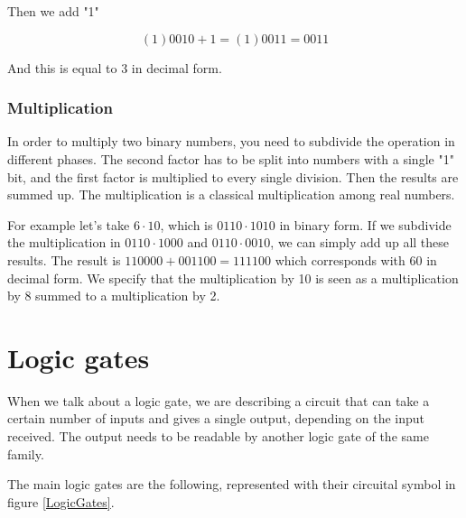 \documentclass{article}
\begin{document}
Then we add "1"

\[(1)0010+1=(1)0011 = 0011\]
  
And this is equal to 3 in decimal form.



\subsubsection{Multiplication}

In order to multiply two binary numbers, you need to subdivide the operation in different phases. The second factor has to be split into numbers with a single "1" bit, and the first factor is multiplied to every single division. Then the results are summed up. The multiplication is a classical multiplication among real numbers. 

\vspace{3mm}

For example let's take $6 \cdot 10$, which is $0110 \cdot 1010$ in binary form. If we subdivide the multiplication in $0110 \cdot 1000$ and $0110 \cdot 0010$, we can simply add up all these results. The result is $110000 + 001100 = 111100$ which corresponds with 60 in decimal form. We specify that the multiplication by 10 is seen as a multiplication by 8 summed to a multiplication by 2.












\section{Logic gates}

When we talk about a logic gate, we are describing a circuit that can take a certain number of inputs and gives a single output, depending on the input received. The output needs to be readable by another logic gate of the same family.

\vspace{3mm}

The main logic gates are the following, represented with their circuital symbol in figure \ref{LogicGates}.
\end{document}
